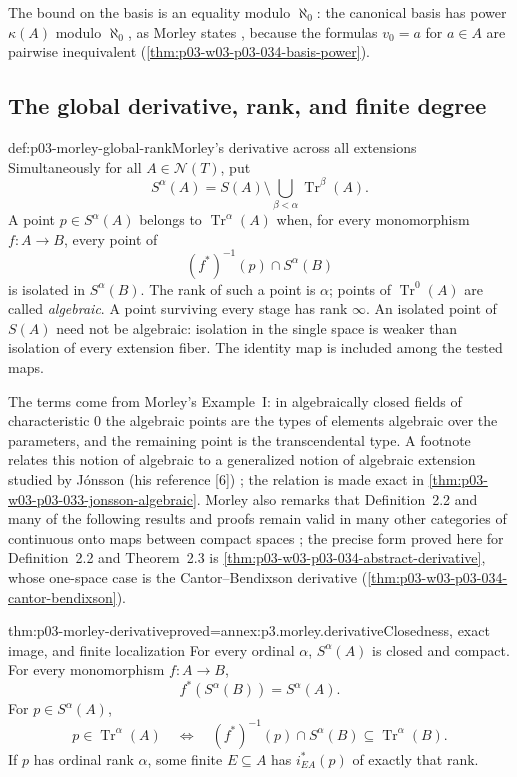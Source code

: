 The bound on the basis is an equality modulo \(\aleph_0\): the canonical
basis has power \(\kappa(A)\) modulo \(\aleph_0\), as Morley states
\cite[p.~518]{Morley1965}, because the formulas \(v_0=a\) for
\(a\in A\) are pairwise inequivalent
(\cref{thm:p03-w03-p03-034-basis-power}).

\subsection{The global derivative, rank, and finite degree}
\label{sec:p03-morley-global-derivative}

\begin{hbdefinition}{def:p03-morley-global-rank}{Morley's derivative across all extensions}
Simultaneously for all \(A\in\mathcal N(T)\), put
\[
 S^\alpha(A)=S(A)\setminus\bigcup_{\beta<\alpha}
                  \operatorname{Tr}^\beta(A).
\]
A point \(p\in S^\alpha(A)\) belongs to
\(\operatorname{Tr}^\alpha(A)\) when, for every monomorphism
\(f:A\to B\), every point of
\[
       (f^*)^{-1}(p)\cap S^\alpha(B)
\]
is isolated in \(S^\alpha(B)\). The rank of such a point is
\(\alpha\); points of \(\operatorname{Tr}^0(A)\) are called
\emph{algebraic}. A point surviving every stage has rank \(\infty\).
An isolated point of \(S(A)\) need not be algebraic: isolation in the
single space is weaker than isolation of every extension fiber.
The identity map is included among the tested maps.
\end{hbdefinition}

The terms come from Morley's Example~I: in algebraically closed fields of
characteristic \(0\) the algebraic points are the types of elements
algebraic over the parameters, and the remaining point is the
transcendental type. A footnote relates this notion of algebraic to a
generalized notion of algebraic extension studied by Jónsson (his
reference [6]) \cite[p.~520, n.~12]{Morley1965}; the relation is made
exact in \cref{thm:p03-w03-p03-033-jonsson-algebraic}. Morley also remarks that
Definition~2.2 and many of the following results and proofs remain valid
in many other categories of continuous onto maps between compact spaces
\cite[p.~520]{Morley1965}; the precise form proved here for Definition~2.2
and Theorem~2.3 is \cref{thm:p03-w03-p03-034-abstract-derivative}, whose
one-space case is the Cantor--Bendixson derivative
(\cref{thm:p03-w03-p03-034-cantor-bendixson}).

\begin{hbtheorem}{thm:p03-morley-derivative}{proved=annex:p3.morley.derivative}{Closedness, exact image, and finite localization}
For every ordinal \(\alpha\), \(S^\alpha(A)\) is closed and compact.
For every monomorphism \(f:A\to B\),
\[
 f^*(S^\alpha(B))=S^\alpha(A).
\]
For \(p\in S^\alpha(A)\),
\[
 p\in\operatorname{Tr}^\alpha(A)
 \quad\Longleftrightarrow\quad
 (f^*)^{-1}(p)\cap S^\alpha(B)
           \subseteq\operatorname{Tr}^\alpha(B).
\]
If \(p\) has ordinal rank \(\alpha\), some finite \(E\subseteq A\)
has \(i_{EA}^*(p)\) of exactly that rank.
\end{hbtheorem}

